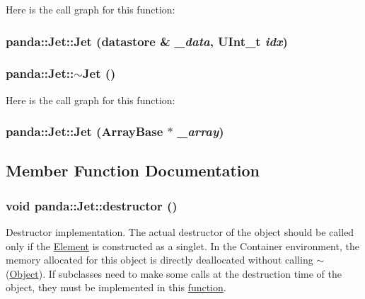Here is the call graph for this function:\hypertarget{classpanda_1_1Jet_a985cc87d1d193a2280e692ab9abc4e64}{
\subsubsection[{Jet}]{\setlength{\rightskip}{0pt plus 5cm}panda::Jet::Jet ({\bf datastore} \& {\em \_\-data}, \/  UInt\_\-t {\em idx})}}
\label{classpanda_1_1Jet_a985cc87d1d193a2280e692ab9abc4e64}
\hypertarget{classpanda_1_1Jet_a00a058429c04ae0709f4383cec5b0410}{
\subsubsection[{$\sim$Jet}]{\setlength{\rightskip}{0pt plus 5cm}panda::Jet::$\sim$Jet ()}}
\label{classpanda_1_1Jet_a00a058429c04ae0709f4383cec5b0410}


Here is the call graph for this function:\hypertarget{classpanda_1_1Jet_a8de74ad474ca0a70037c372b59b4cd1e}{
\subsubsection[{Jet}]{\setlength{\rightskip}{0pt plus 5cm}panda::Jet::Jet ({\bf ArrayBase} $\ast$ {\em \_\-array})}}
\label{classpanda_1_1Jet_a8de74ad474ca0a70037c372b59b4cd1e}


\subsection{Member Function Documentation}
\hypertarget{classpanda_1_1Jet_adbd430a93e346588348e1eebaa90c42a}{
\subsubsection[{destructor}]{\setlength{\rightskip}{0pt plus 5cm}void panda::Jet::destructor ()}}
\label{classpanda_1_1Jet_adbd430a93e346588348e1eebaa90c42a}


Destructor implementation. The actual destructor of the object should be called only if the \hyperlink{classpanda_1_1Element}{Element} is constructed as a singlet. In the Container environment, the memory allocated for this object is directly deallocated without calling $\sim$(\hyperlink{classpanda_1_1Object}{Object}). If subclasses need to make some calls at the destruction time of the object, they must be implemented in this \hyperlink{namespacepanda_1_1function}{function}. 


